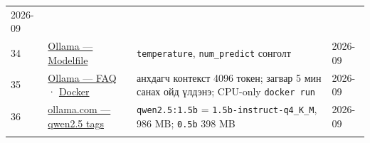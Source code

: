 \begin{longtable}[]{@{}llll@{}}
\begin{minipage}[t]{0.22\columnwidth}
2026-09\strut
\end{minipage}\tabularnewline
\begin{minipage}[t]{0.22\columnwidth}\raggedright
34\strut
\end{minipage} & \begin{minipage}[t]{0.22\columnwidth}\raggedright
\href{https://github.com/ollama/ollama/blob/main/docs/modelfile.mdx}{Ollama --- Modelfile}\strut
\end{minipage} & \begin{minipage}[t]{0.22\columnwidth}\raggedright
\texttt{temperature}, \texttt{num\_predict} сонголт\strut
\end{minipage} & \begin{minipage}[t]{0.22\columnwidth}\raggedright
2026-09\strut
\end{minipage}\tabularnewline
\begin{minipage}[t]{0.22\columnwidth}\raggedright
35\strut
\end{minipage} & \begin{minipage}[t]{0.22\columnwidth}\raggedright
\href{https://docs.ollama.com/faq}{Ollama --- FAQ} · \href{https://docs.ollama.com/docker}{Docker}\strut
\end{minipage} & \begin{minipage}[t]{0.22\columnwidth}\raggedright
анхдагч контекст 4096 токен; загвар 5 мин санах ойд үлдэнэ; CPU-only \texttt{docker\ run}\strut
\end{minipage} & \begin{minipage}[t]{0.22\columnwidth}\raggedright
2026-09\strut
\end{minipage}\tabularnewline
\begin{minipage}[t]{0.22\columnwidth}\raggedright
36\strut
\end{minipage} & \begin{minipage}[t]{0.22\columnwidth}\raggedright
\href{https://ollama.com/library/qwen2.5/tags}{ollama.\allowbreak{}com --- qwen2.\allowbreak{}5 tags}\strut
\end{minipage} & \begin{minipage}[t]{0.22\columnwidth}\raggedright
\texttt{qwen2.5:1.5b} = \texttt{1.\allowbreak{}5b-instruct-q4\_\allowbreak{}K\_\allowbreak{}M}, 986 MB; \texttt{0.5b} 398 MB\strut
\end{minipage} & \begin{minipage}[t]{0.22\columnwidth}\raggedright
2026-09\strut
\end{minipage}\tabularnewline
\begin{minipage}[t]{0.22\columnwidth}\raggedright

\end{minipage}
\end{longtable}
